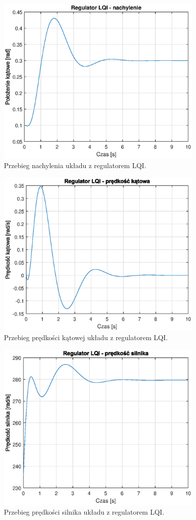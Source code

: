 \documentclass[11pt,a4paper]{article}
\begin{document}
\begin{figure}[H]
	\centering
	\includegraphics[width=4in]{Figures/LQI_model_03_alpha_v.eps}
	\caption{Przebieg nachylenia układu z regulatorem LQI.}
	\label{fig:LQI_model_03_alpha_v}
\end{figure}

\begin{figure}[H]
	\centering
	\includegraphics[width=4in]{Figures/LQI_model_03_dalpha_v.eps}
	\caption{Przebieg prędkości kątowej układu z regulatorem LQI.}
	\label{fig:LQI_model_03_dalpha_v}
\end{figure}

\begin{figure}[H]
	\centering
	\includegraphics[width=4in]{Figures/LQI_model_03_w_v.eps}
	\caption{Przebieg prędkości silnika układu z regulatorem LQI.}
	\label{fig:LQI_model_03_w_v}
\end{figure}
\end{document}
